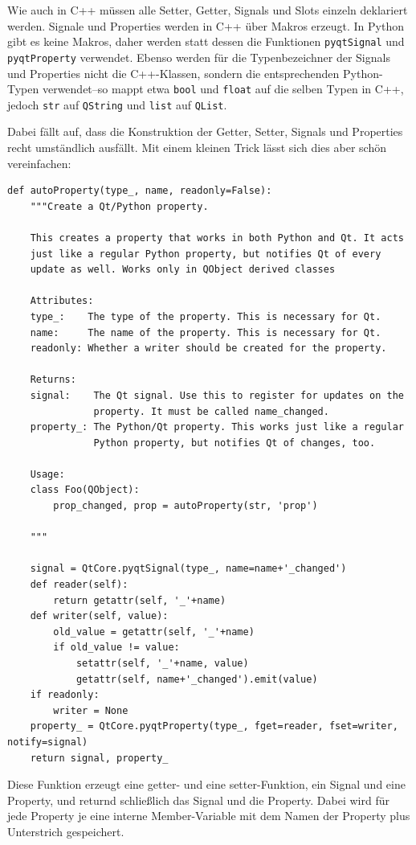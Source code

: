 \documentclass[a4paper]{article}
\begin{document}
Wie auch in C++ müssen alle Setter, Getter, Signals und Slots einzeln deklariert werden. Signale und Properties werden in C++ über Makros erzeugt. In Python gibt es keine Makros, daher werden statt dessen die Funktionen \verb~pyqtSignal~ und \verb~pyqtProperty~ verwendet. Ebenso werden für die Typenbezeichner der Signals und Properties nicht die C++-Klassen, sondern die entsprechenden Python-Typen verwendet--so mappt etwa \verb~bool~ und \verb~float~ auf die selben Typen in C++, jedoch \verb~str~ auf \verb~QString~ und \verb~list~ auf \verb~QList~.

Dabei fällt auf, dass die Konstruktion der Getter, Setter, Signals und Properties recht umständlich ausfällt. Mit einem kleinen Trick lässt sich dies aber schön vereinfachen:

\begin{verbatim}
def autoProperty(type_, name, readonly=False):
    """Create a Qt/Python property.

    This creates a property that works in both Python and Qt. It acts
    just like a regular Python property, but notifies Qt of every
    update as well. Works only in QObject derived classes

    Attributes:
    type_:    The type of the property. This is necessary for Qt.
    name:     The name of the property. This is necessary for Qt.
    readonly: Whether a writer should be created for the property.

    Returns:
    signal:    The Qt signal. Use this to register for updates on the
               property. It must be called name_changed.
    property_: The Python/Qt property. This works just like a regular
               Python property, but notifies Qt of changes, too.

    Usage:
    class Foo(QObject):
        prop_changed, prop = autoProperty(str, 'prop')

    """

    signal = QtCore.pyqtSignal(type_, name=name+'_changed')
    def reader(self):
        return getattr(self, '_'+name)
    def writer(self, value):
        old_value = getattr(self, '_'+name)
        if old_value != value:
            setattr(self, '_'+name, value)
            getattr(self, name+'_changed').emit(value)
    if readonly:
        writer = None
    property_ = QtCore.pyqtProperty(type_, fget=reader, fset=writer, notify=signal)
    return signal, property_
\end{verbatim}

Diese Funktion erzeugt eine getter- und eine setter-Funktion, ein Signal und eine Property, und returnd schließlich das Signal und die Property. Dabei wird für jede Property je eine interne Member-Variable mit dem Namen der Property plus Unterstrich gespeichert.
\end{document}
